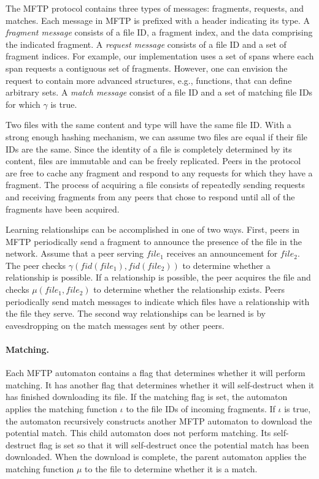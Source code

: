 \documentclass[letterpaper]{article}
\begin{document}
The MFTP protocol contains three types of messages: fragments, requests, and matches.
Each message in MFTP is prefixed with a header indicating its type.
A \emph{fragment message} consists of a file ID, a fragment index, and the data comprising the indicated fragment.
A \emph{request message} consists of a file ID and a set of fragment indices.
For example, our implementation uses a set of spans where each span requests a contiguous set of fragments.
However, one can envision the request to contain more advanced structures, e.g., functions, that can define arbitrary sets.
A \emph{match message} consist of a file ID and a set of matching file IDs for which $\gamma$ is true.

Two files with the same content and type will have the same file ID.
With a strong enough hashing mechanism, we can assume two files are equal if their file IDs are the same.
Since the identity of a file is completely determined by its content, files are immutable and can be freely replicated.
Peers in the protocol are free to cache any fragment and respond to any requests for which they have a fragment.
The process of acquiring a file consists of repeatedly sending requests and receiving fragments from any peers that chose to respond until all of the fragments have been acquired.

Learning relationships can be accomplished in one of two ways.
First, peers in MFTP periodically send a fragment to announce the presence of the file in the network.
Assume that a peer serving $file_1$ receives an announcement for $file_2$.
The peer checks $\gamma(fid(file_1), fid(file_2))$ to determine whether a relationship is possible.
If a relationship is possible, the peer acquires the file and checks $\mu(file_1, file_2)$ to determine whether the relationship exists.
Peers periodically send match messages to indicate which files have a relationship with the file they serve.
The second way relationships can be learned is by eavesdropping on the match messages sent by other peers.


\paragraph{Matching.}
Each MFTP automaton contains a flag that determines whether it will perform matching. 
It has another flag that determines whether it will self-destruct when it has finished downloading its file.
If the matching flag is set, the automaton applies the matching function $\iota$ to the file IDs of incoming fragments.
If $\iota$ is true, the automaton recursively constructs another MFTP automaton to download the potential match.
This child automaton does not perform matching.  
Its self-destruct flag is set so that it will self-destruct once the potential match has been downloaded.
When the download is complete, the parent automaton applies the matching function $\mu$ to the file to determine whether it is a match.
\end{document}
